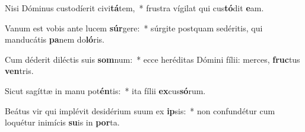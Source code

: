\item Nisi Dóminus custodíerit civi\textbf{tá}tem,~* frustra vígilat qui cus\textbf{tó}dit \textbf{e}am.
\item Vanum est vobis ante lucem \textbf{súr}gere:~* súrgite postquam sedéritis, qui manducátis \textbf{pa}nem do\textbf{ló}ris.
\item Cum déderit diléctis suis \textbf{som}num:~* ecce heréditas Dómini fílii: merces, \textbf{fruc}tus \textbf{ven}tris.
\item Sicut sagíttæ in manu pot\textbf{én}tis:~* ita fílii \textbf{ex}cus\textbf{só}rum.
\item Beátus vir qui implévit desidérium suum ex \textbf{ip}sis:~* non confundétur cum loquétur inimícis \textbf{su}is in \textbf{por}ta.
